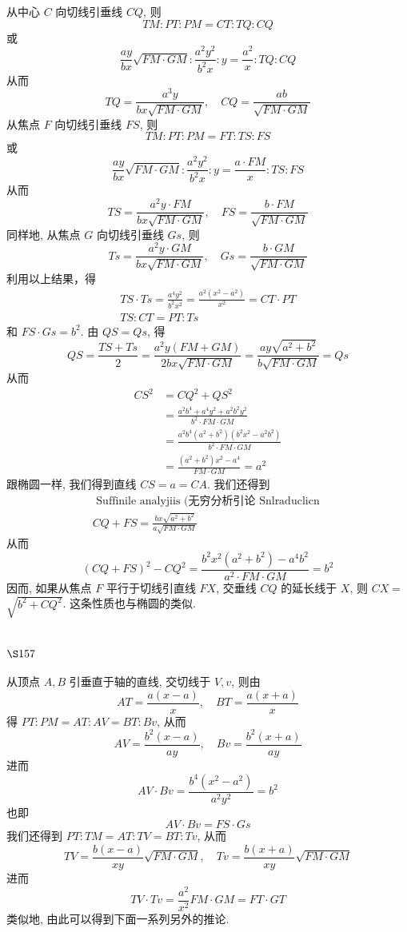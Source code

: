 从中心 $C$ 向切线引垂线 $C Q$, 则
\[
T M: P T: P M=C T: T Q: C Q
\]
或
\[
\frac{a y}{b x} \sqrt{F M \cdot G M}: \frac{a^{2} y^{2}}{b^{2} x}: y=\frac{a^{2}}{x}: T Q: C Q
\]
从而
\[
T Q=\frac{a^{3} y}{b x \sqrt{F M \cdot G M}}, \quad C Q=\frac{a b}{\sqrt{F M \cdot G M}}
\]
从焦点 $F$ 向切线引垂线 $F S$, 则
\[
T M: P T: P M=F T: T S: F S
\]
或
\[
\frac{a y}{b x} \sqrt{F M \cdot G M}: \frac{a^{2} y^{2}}{b^{2} x}: y=\frac{a \cdot F M}{x}: T S: F S
\]
从而
\[
T S=\frac{a^{2} y \cdot F M}{b x \sqrt{F M \cdot G M}}, \quad F S=\frac{b \cdot F M}{\sqrt{F M \cdot G M}}
\]
同样地, 从焦点 $G$ 向切线引垂线 $G s$, 则
\[
T s=\frac{a^{2} y \cdot G M}{b x \sqrt{F M \cdot G M}}, \quad G s=\frac{b \cdot G M}{\sqrt{F M \cdot G M}}
\]
利用以上结果，得
\[
\begin{gathered}
T S \cdot T s=\frac{a^{4} y^{2}}{b^{2} x^{2}}=\frac{a^{2}\left(x^{2}-a^{2}\right)}{x^{2}}=C T \cdot P T \\
T S: C T=P T: T s
\end{gathered}
\]
和 $F S \cdot G s=b^{2}$. 由 $Q S=Q s$, 得
\[
Q S=\frac{T S+T s}{2}=\frac{a^{2} y(F M+G M)}{2 b x \sqrt{F M \cdot G M}}=\frac{a y \sqrt{a^{2}+b^{2}}}{b \sqrt{F M \cdot G M}}=Q s
\]
从而
\[
\begin{aligned}
C S^{2} & =C Q^{2}+Q S^{2} \\
& =\frac{a^{2} b^{4}+a^{4} y^{2}+a^{2} b^{2} y^{2}}{b^{2} \cdot F M \cdot G M} \\
& =\frac{a^{2} b^{4}\left(a^{2}+b^{2}\right)\left(b^{2} x^{2}-a^{2} b^{2}\right)}{b^{2} \cdot F M \cdot G M} \\
& =\frac{\left(a^{2}+b^{2}\right) x^{2}-a^{4}}{F M \cdot G M}=a^{2}
\end{aligned}
\]
跟椭圆一样, 我们得到直线 $C S=a=C A$. 我们还得到 
\[
\begin{gathered}
\text { Suffinile analyjiis (无穷分析引论 Snlraduclicn } \\
C Q+F S=\frac{b x \sqrt{a^{2}+b^{2}}}{a \sqrt{F M \cdot G M}}
\end{gathered}
\]
从而
\[
(C Q+F S)^{2}-C Q^{2}=\frac{b^{2} x^{2}\left(a^{2}+b^{2}\right)-a^{4} b^{2}}{a^{2} \cdot F M \cdot G M}=b^{2}
\]
因而, 如果从焦点 $F$ 平行于切线引直线 $F X$, 交垂线 $C Q$ 的延长线于 $X$, 则 $C X=$ $\sqrt{b^{2}+C Q^{2}}$. 这条性质也与椭圆的类似.

\section{$\S 157$}

从顶点 $A, B$ 引垂直于轴的直线, 交切线于 $V, v$, 则由
\[
A T=\frac{a(x-a)}{x}, \quad B T=\frac{a(x+a)}{x}
\]
得 $P T: P M=A T: A V=B T: B v$, 从而
\[
A V=\frac{b^{2}(x-a)}{a y}, \quad B v=\frac{b^{2}(x+a)}{a y}
\]
进而
\[
A V \cdot B v=\frac{b^{4}\left(x^{2}-a^{2}\right)}{a^{2} y^{2}}=b^{2}
\]
也即
\[
A V \cdot B v=F S \cdot G s
\]
我们还得到 $P T: T M=A T: T V=B T: T v$, 从而
\[
T V=\frac{b(x-a)}{x y} \sqrt{F M \cdot G M}, \quad T v=\frac{b(x+a)}{x y} \sqrt{F M \cdot G M}
\]
进而
\[
T V \cdot T v=\frac{a^{2}}{x^{2}} F M \cdot G M=F T \cdot G T
\]
类似地, 由此可以得到下面一系列另外的推论.

